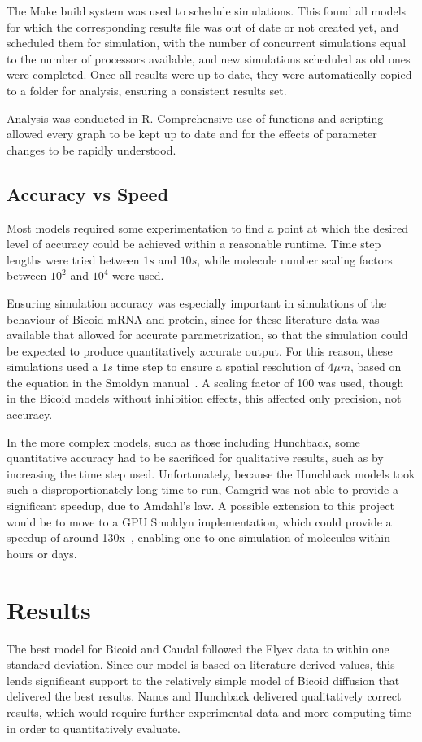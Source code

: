 \documentclass[11pt,a4paper,twocolumn]{article}
\begin{document}
The Make build system was used to schedule simulations. This found all models for which the corresponding results file was out of date or not created yet, and scheduled them for simulation, with the number of concurrent simulations equal to the number of processors available, and new simulations scheduled as old ones were completed. Once all results were up to date, they were automatically copied to a folder for analysis, ensuring a consistent results set.

Analysis was conducted in R. Comprehensive use of functions and scripting allowed every graph to be kept up to date and for the effects of parameter changes to be rapidly understood.

\subsection{Accuracy vs Speed}
Most models required some experimentation to find a point at which the desired level of accuracy could be achieved within a reasonable runtime. Time step lengths were tried between \(1s\) and \(10s\), while molecule number scaling factors between \(10^2\) and \(10^4\) were used. 

Ensuring simulation accuracy was especially important in simulations of the behaviour of Bicoid mRNA and protein, since for these literature data was available that allowed for accurate parametrization, so that the simulation could be expected to produce quantitatively accurate output. For this reason, these simulations used a \(1s\) time step to ensure a spatial resolution of \(4\mu m\), based on the equation in the Smoldyn manual~\cite{Andrews2011}. A scaling factor of 100 was used, though in the Bicoid models without inhibition effects, this affected only precision, not accuracy.

In the more complex models, such as those including Hunchback, some quantitative accuracy had to be sacrificed for qualitative results, such as by increasing the time step used. Unfortunately, because the Hunchback models took such a disproportionately long time to run, Camgrid was not able to provide a significant speedup, due to Amdahl’s law. A possible extension to this project would be to move to a GPU Smoldyn implementation, which could provide a speedup of around 130x~\cite{Dematte2010}, enabling one to one simulation of molecules within hours or days.

\section{Results}
The best model for Bicoid and Caudal followed the Flyex data to within one standard deviation. Since our model is based on literature derived values, this lends significant support to the relatively simple model of Bicoid diffusion that delivered the best results. Nanos and Hunchback delivered qualitatively correct results, which would require further experimental data and more computing time in order to quantitatively evaluate.

\nocite{*}


\end{document}
